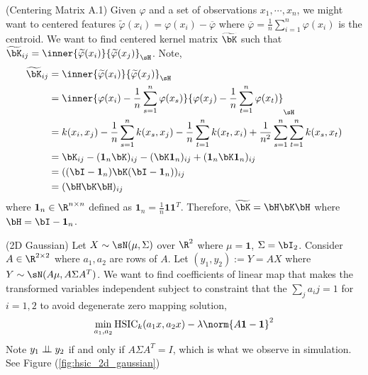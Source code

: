 \documentclass[11pt]{article}
\begin{document}
\begin{example}
    \label{exampe_centering_matrix}
    (Centering Matrix \cite{scholkopfNonlinearComponentAnalysis1998} A.1) Given $\varphi$ and a set of observations $x_1,\cdots,x_n$, we might want to centered features $\widetilde{\varphi}(x_i) = \varphi(x_i) - \overline{\varphi}$ where $\overline{\varphi} = \frac{1}{n}\sum_{i=1}^n \varphi(x_i)$ is the centroid. We want to find centered kernel matrix $\widetilde{\bK}$ such that $\widetilde{\bK}_{ij} = \inner{\widetilde{\varphi}(x_i)}{\widetilde{\varphi}(x_j)}_{\sH}$. Note,
    \begin{align}
        \widetilde{\bK}_{ij}
            &= \inner{\widetilde{\varphi}(x_i)}{\widetilde{\varphi}(x_j)}_{\sH} \\
            &= \inner{ \varphi(x_i) - \frac{1}{n}\sum_{s=1}^n \varphi(x_s) }{ \varphi(x_j) - \frac{1}{n}\sum_{t=1}^n \varphi(x_t) }_{\sH} \\ 
            &= k(x_i,x_j) - \frac{1}{n} \sum_{s=1}^n k(x_s, x_j) - \frac{1}{n} \sum_{t=1}^n k(x_t, x_i) + \frac{1}{n^2} \sum_{s=1}^n \sum_{t=1}^n k(x_s, x_t) \\ 
            &= \bK_{ij} - (\mathbf{1}_n \bK)_{ij} - (\bK\mathbf{1}_n)_{ij} + (\mathbf{1}_n \bK \mathbf{1}_n)_{ij} \\ 
            &= (( \bI - \mathbf{1}_n ) \bK ( \bI - \mathbf{1}_n ))_{ij} \\
            &= (\bH\bK\bH)_{ij}
    \end{align}
    where $\mathbf{1}_n \in \R^{n\times n}$ defined as $\mathbf{1}_n = \frac{1}{n}\mathbf{1}\mathbf{1}^T$. Therefore, $\widetilde{\bK} = \bH \bK \bH$ where $\bH = \bI - \mathbf{1}_n$.
\end{example}



    
\begin{example}
    (2D Gaussian) Let $X\sim \sN(\mu, \Sigma)$ over $\R^2$ where $\mu=\mathbf{1}$, $\Sigma=\bI_2$. Consider $A \in \R^{2\times 2}$ where $a_1,a_2$ are rows of $A$. Let $(y_1,y_2) := Y = AX$ where $Y\sim \sN(A\mu, A\Sigma A^T)$. We want to find coefficients of linear map that makes the transformed variables independent subject to constraint that the $\sum_{j} a_ij = 1$ for $i=1,2$ to avoid degenerate zero mapping solution,
    \begin{align}
        \label{eq:hsic_2d_gaussian_optimization}
        \min_{a_1,a_2} \text{HSIC}_k(a_1x, a_2x) - \lambda \norm{ A\mathbf{1}-\mathbf{1} }^2
    \end{align}
    Note $y_1\perp\!\!\!\perp y_2$ if and only if $A\Sigma A^T = I$, which is what we observe in simulation. See Figure (\ref{fig:hsic_2d_gaussian})
\end{example} 
\end{document}
